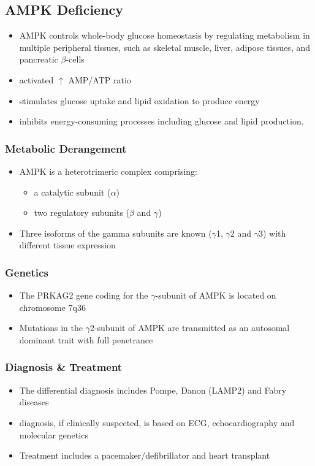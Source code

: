 \documentclass{scrartcl}
\begin{document}
\subsection{AMPK Deficiency}
\label{sec:orgec66a3d}
\begin{itemize}
\item AMPK controls whole-body glucose homeostasis by regulating metabolism in multiple peripheral tissues, such as
skeletal muscle, liver, adipose tissues, and pancreatic \(\beta\)-cells
\item activated \(\uparrow\) AMP/ATP ratio
\item stimulates glucose uptake and lipid oxidation to produce energy
\item inhibits energy-consuming processes including glucose and lipid production.
\end{itemize}

\subsubsection{Metabolic Derangement}
\label{sec:org8e7c52f}
\begin{itemize}
\item AMPK is a heterotrimeric complex comprising:
\begin{itemize}
\item a catalytic subunit (\(\alpha\))
\item two regulatory subunits (\(\beta\) and \(\gamma\))
\end{itemize}
\item Three isoforms of the gamma subunits are known (\(\gamma\)1, \(\gamma\)2 and \(\gamma\)3) with different tissue
expression
\end{itemize}

\subsubsection{Genetics}
\label{sec:org7b00026}
\begin{itemize}
\item The PRKAG2 gene coding for the \(\gamma\)-subunit of AMPK is located on chromosome 7q36
\item Mutations in the \(\gamma\)2-subunit of AMPK are transmitted as an
autosomal dominant trait with full penetrance
\end{itemize}

\subsubsection{Diagnosis \& Treatment}
\label{sec:orgb18c611}
\begin{itemize}
\item The differential diagnosis includes Pompe, Danon (LAMP2) and Fabry diseases
\item diagnosis, if clinically suspected, is based on ECG,
echocardiography and molecular genetics
\item Treatment includes a pacemaker/defibrillator and heart transplant
\end{itemize}
\end{document}
